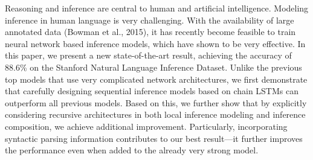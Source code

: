 Reasoning and inference are central to human and artificial intelligence. Modeling inference in human language is very challenging. With the availability of large annotated data (Bowman et al., 2015), it has recently become feasible to train neural network based inference models, which have shown to be very effective. In this paper, we present a new state-of-the-art result, achieving the accuracy of 88.6\% on the Stanford Natural Language Inference Dataset. Unlike the previous top models that use very complicated network architectures, we first demonstrate that carefully designing sequential inference models based on chain LSTMs can outperform all previous models. Based on this, we further show that by explicitly considering recursive architectures in both local inference modeling and inference composition, we achieve additional improvement. Particularly, incorporating syntactic parsing information contributes to our best result---it further improves the performance even when added to the already very strong model.
